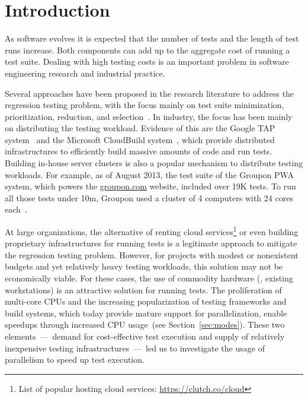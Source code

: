 \section{Introduction}
\label{sec:intro}


As software evolves it is expected that the number of tests and the
length of test runs increase.  Both components can add up to the
aggregate cost of running a test suite.  Dealing with high testing
costs is an important problem in software engineering research and
industrial practice.

Several approaches have been proposed in the research literature to
address the regression testing problem, with the focus mainly on test
suite minimization, prioritization, reduction, and
selection~\cite{yoo-harman-stvr2012}.  In industry, the focus has been
mainly on distributing the testing workload.  Evidence of this are the
Google TAP system~\cite{google-tap,google-ci} and the Microsoft
CloudBuild system~\cite{prasad-shulte-ieee-microsoft-ci}, which
provide distributed infrastructures to efficiently build massive
amounts of code and run tests.  Building in-house server clusters is also a
popular mechanism to distribute testing workloads.  For example, as of
August 2013, the test suite of the Groupon PWA system, which powers the
\url{groupon.com} website, included over 19K tests.  To run all those
tests under 10m, Groupon used a cluster of 4 computers with 24 cores
each~\cite{kim-etal-fse2013}.

At large organizations, the alternative of renting cloud
services\footnote{List of popular hosting cloud services:
  \url{https://clutch.co/cloud}} or even building proprietary
infrastructures for running tests is a legitimate approach to mitigate
the regression testing problem.  However, for projects with modest
 or nonexistent budgets and yet relatively heavy testing workloads, this solution may
not be economically viable.  For these cases, the use of commodity
hardware (\eg{}, existing workstations) is an attractive
solution for running tests.  The proliferation of
multi-core CPUs and the increasing popularization of testing
frameworks and build systems, which today provide mature support for
parallelization, enable speedups through increased CPU
usage~(see Section~\ref{sec:modes}).  These two elements~---~demand
for cost-effective test execution and supply of relatively inexpensive
testing infrastructures~---~led us to investigate the usage of
parallelism to speed up test execution.

